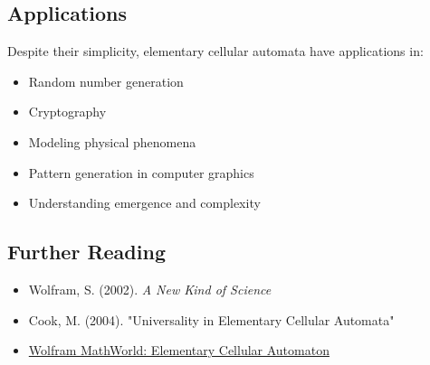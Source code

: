 \documentclass{article}
\begin{document}
\subsection{Applications}

Despite their simplicity, elementary cellular automata have applications in:

\begin{itemize}
\item Random number generation
\item Cryptography
\item Modeling physical phenomena
\item Pattern generation in computer graphics
\item Understanding emergence and complexity
\end{itemize}

\subsection{Further Reading}

\begin{itemize}
\item Wolfram, S. (2002). \emph{A New Kind of Science}
\item Cook, M. (2004). "Universality in Elementary Cellular Automata"
\item \href{https://mathworld.wolfram.com/ElementaryCellularAutomaton.html}{Wolfram MathWorld: Elementary Cellular Automaton}
\end{itemize}
\end{document}
